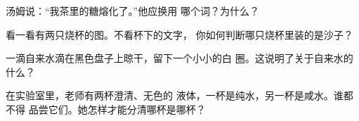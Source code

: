 \begin{exercise}[$\star$]\label{exo:g2:mixing-and-dissolving:8}
汤姆说：“我茶里的糖熔化了。”他应换用
哪个词？为什么？
\end{exercise}

\begin{exercise}[$\star\star$]\label{exo:g2:mixing-and-dissolving:9}
看一看有两只烧杯的图。不看杯下的文字，
你如何判断哪只烧杯里装的是沙子？
\end{exercise}

\begin{exercise}[$\star\star$]\label{exo:g2:mixing-and-dissolving:10}
一滴自来水滴在黑色盘子上晾干，留下一个小小的白
圈。这说明了关于自来水的什么？
\end{exercise}

\begin{exercise}[$\star\star$]\label{exo:g2:mixing-and-dissolving:11}
在实验室里，老师有两杯澄清、无色的
液体，一杯是纯水，另一杯是咸水。谁都不得
品尝它们。她怎样才能分清哪杯是哪杯？
\end{exercise}
